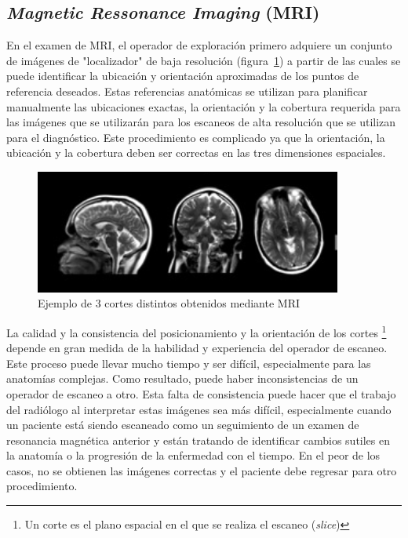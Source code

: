 \cite{noauthor_introducing_nodate}

    \subsection{\emph{Magnetic Ressonance Imaging} (MRI)}%
    En el examen de MRI, el operador de exploración primero adquiere un conjunto de imágenes de "localizador" de baja resolución (figura~\ref{fig:resonancia}) a partir de las cuales se puede identificar la ubicación y orientación aproximadas de los puntos de referencia deseados. Estas referencias anatómicas se utilizan para planificar manualmente las ubicaciones exactas, la orientación y la cobertura requerida para las imágenes que se utilizarán para los escaneos de alta resolución que se utilizan para el diagnóstico. Este procedimiento es complicado ya que la orientación, la ubicación y la cobertura deben ser correctas en las tres dimensiones
     espaciales.
     
     \begin{figure}[H]
        \centering
        \includegraphics[width=0.9\textwidth]{resonancia.png}
        \caption{Ejemplo de 3 cortes distintos obtenidos mediante MRI}%
        \label{fig:resonancia}
     \end{figure}
    
    La calidad y la consistencia del posicionamiento y la orientación de los cortes
    \footnote{Un corte es el plano espacial en el que se realiza el escaneo (\emph{slice})}
    depende en gran medida de la habilidad y experiencia del operador de escaneo. Este proceso puede llevar mucho tiempo y ser difícil, especialmente para las anatomías complejas. Como resultado, puede haber inconsistencias de un operador de escaneo a otro. Esta falta de consistencia puede hacer que el trabajo del radiólogo al interpretar estas imágenes sea más difícil, especialmente cuando un paciente está siendo escaneado como un seguimiento de un examen de resonancia magnética anterior y están tratando de identificar cambios sutiles en la anatomía o la progresión de la enfermedad con el tiempo. En el peor de los casos, no se obtienen las imágenes correctas y el paciente debe regresar para otro procedimiento.
    

